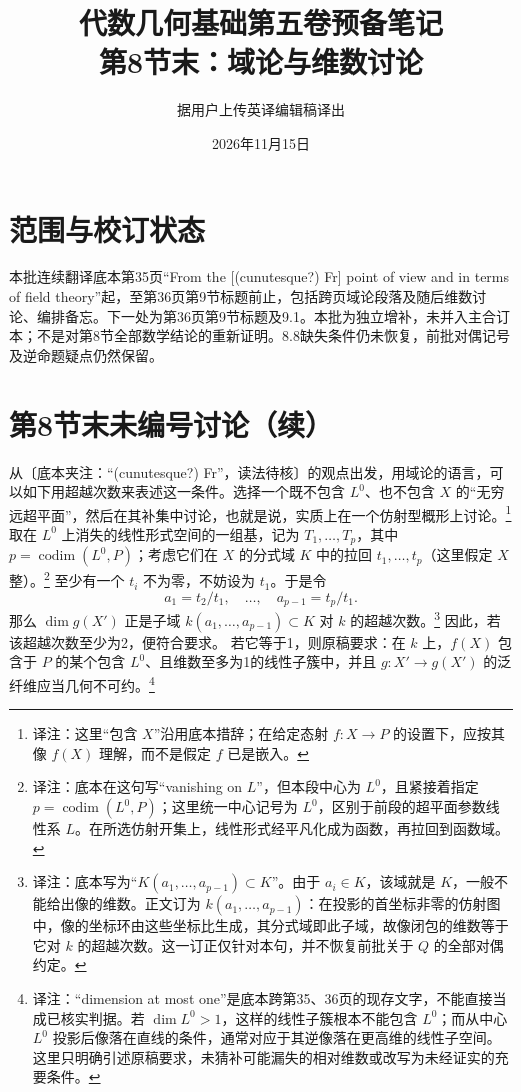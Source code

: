 \documentclass[openany]{ctexbook}
\title{代数几何基础第五卷预备笔记\\第8节末：域论与维数讨论}
\author{据用户上传英译编辑稿译出}
\date{2026年11月15日}
\newcommand{\note}[1]{\footnote{译注：#1}}
\begin{document}
\maketitle
\chapter*{范围与校订状态}
本批连续翻译底本第35页“From the [(cunutesque?) Fr] point of view and in terms of field theory”起，至第36页第9节标题前止，包括跨页域论段落及随后维数讨论、编排备忘。下一处为第36页第9节标题及9.1。本批为独立增补，未并入主合订本；不是对第8节全部数学结论的重新证明。8.8缺失条件仍未恢复，前批对偶记号及逆命题疑点仍然保留。
\chapter*{第8节末未编号讨论（续）}
从〔底本夹注：“(cunutesque?) Fr”，读法待核〕的观点出发，用域论的语言，可以如下用超越次数来表述这一条件。选择一个既不包含 $L^0$、也不包含 $X$ 的“无穷远超平面”，然后在其补集中讨论，也就是说，实质上在一个仿射型概形上讨论。\note{这里“包含 $X$”沿用底本措辞；在给定态射 $f:X\to P$ 的设置下，应按其像 $f(X)$ 理解，而不是假定 $f$ 已是嵌入。}
取在 $L^0$ 上消失的线性形式空间的一组基，记为 $T_1,\ldots,T_p$，其中 $p=\operatorname{codim}(L^0,P)$；考虑它们在 $X$ 的分式域 $K$ 中的拉回 $t_1,\ldots,t_p$（这里假定 $X$ 整）。\note{底本在这句写“vanishing on $L$”，但本段中心为 $L^0$，且紧接着指定 $p=\operatorname{codim}(L^0,P)$；这里统一中心记号为 $L^0$，区别于前段的超平面参数线性系 $L$。在所选仿射开集上，线性形式经平凡化成为函数，再拉回到函数域。}
至少有一个 $t_i$ 不为零，不妨设为 $t_1$。于是令
\[
a_1=t_2/t_1,\quad\ldots,\quad a_{p-1}=t_p/t_1.
\]
那么 $\dim g(X')$ 正是子域 $k(a_1,\ldots,a_{p-1})\subset K$ 对 $k$ 的超越次数。\note{底本写为“$K(a_1,\ldots,a_{p-1})\subset K$”。由于 $a_i\in K$，该域就是 $K$，一般不能给出像的维数。正文订为 $k(a_1,\ldots,a_{p-1})$：在投影的首坐标非零的仿射图中，像的坐标环由这些坐标比生成，其分式域即此子域，故像闭包的维数等于它对 $k$ 的超越次数。这一订正仅针对本句，并不恢复前批关于 $Q$ 的全部对偶约定。}
因此，若该超越次数至少为2，便符合要求。
若它等于1，则原稿要求：在 $k$ 上，$f(X)$ 包含于 $P$ 的某个包含 $L^0$、且维数至多为1的线性子簇中，并且 $g:X'\to g(X')$ 的泛纤维应当几何不可约。\note{“dimension at most one”是底本跨第35、36页的现存文字，不能直接当成已核实判据。若 $\dim L^0>1$，这样的线性子簇根本不能包含 $L^0$；而从中心 $L^0$ 投影后像落在直线的条件，通常对应于其逆像落在更高维的线性子空间。这里只明确引述原稿要求，未猜补可能漏失的相对维数或改写为未经证实的充要条件。}
\end{document}

